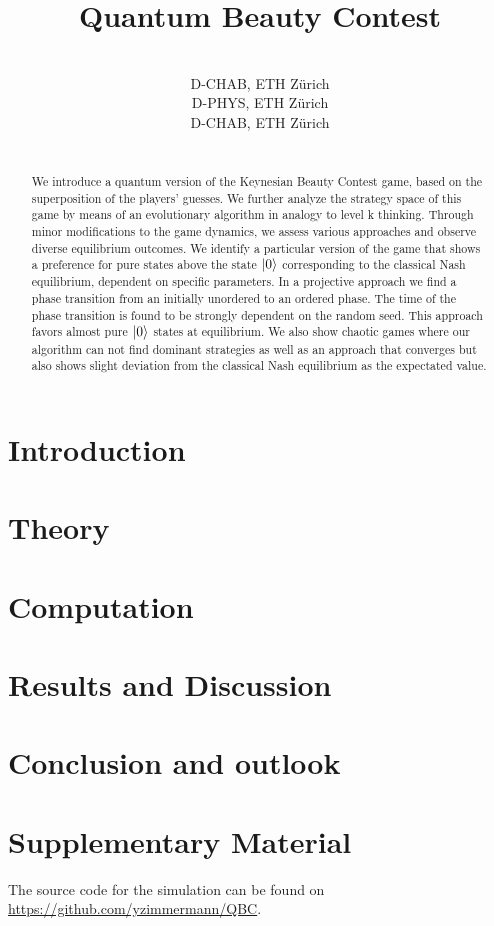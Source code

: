 \documentclass[pmlr,twocolumn,10pt]{jmlr} %
\title[Quantum Beauty Contest]{Quantum Beauty Contest}
\author{%
\Name{Philipp Pestlin}\Email{ppestlin@ethz.ch}\\
\addr D-CHAB, ETH Zürich
\AND
\Name{Tommaso Antonelli} \Email{tantonelli@ethz.ch}\\
\addr D-PHYS, ETH Zürich
\AND
\Name{Yoel Zimmermann} \Email{yzimmermann@ethz.ch}\\
\addr D-CHAB, ETH Zürich
}
\begin{document}
\maketitle

\begin{abstract}
\vspace{-0.6cm}\\
We introduce a quantum version of the Keynesian Beauty Contest game, based on the superposition of the players' guesses. We further analyze the strategy space of this game by means of an evolutionary algorithm in analogy to level k thinking. Through minor modifications to the game dynamics, we assess various approaches and observe diverse equilibrium outcomes. We identify a particular version of the game that shows a preference for pure states above the state $\ket{0}$ corresponding to the classical Nash equilibrium, dependent on specific parameters.
In a projective approach we find a phase transition from an initially unordered to an ordered phase. The time of the phase transition is found to be strongly dependent on the random seed. This approach favors almost pure $\ket{0}$ states at equilibrium. We also show chaotic games where our algorithm can not find dominant strategies as well as an approach that converges but also shows slight deviation from the classical Nash equilibrium as the expectated value.
\end{abstract}
\section{Introduction}


\section{Theory}


\section{Computation}


\section{Results and Discussion}


\section{Conclusion and outlook}


\newpage



\appendix

\section{Supplementary Material}\label{apd:first}
The source code for the simulation can be found on \url{https://github.com/yzimmermann/QBC}.
\end{document}
